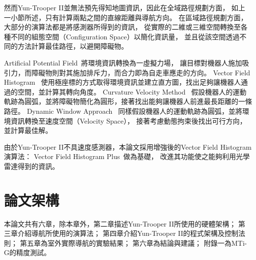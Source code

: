 然而Yun-Trooper II並無法預先得知地圖資訊，因此在全域路徑規劃方面，
如上一小節所述，只有計算兩點之間的直線距離與導航方向。
在區域路徑規劃方面，大部分的演算法都是將感測器所得到的資訊，
從實際的二維或三維空間轉換至各種不同的組態空間（Configuration Space）以簡化資訊量，
並且從該空間透過不同的方法計算最佳路徑，以避開障礙物。

Artificial Potential Field~\cite{Khatib:1985:APF}將環境資訊轉換為一虛擬力場，
讓目標對機器人施加吸引力，而障礙物則對其施加排斥力，而合力即為自走車應走的方向。
Vector Field Histogram~\cite{Borenstein:1991:VFH}
使用極座標的方式取得環境資訊並建立直方圖，找出足夠讓機器人通過的空間，並計算其轉向角度。
Curvature Velocity Method~\cite{Simmons:1996:CVM}
假設機器人的運動軌跡為圓弧，並將障礙物簡化為圓形，接著找出能夠讓機器人前進最長距離的一條路徑。
Dynamic Window Approach~\cite{Thrun:1997:DW}
同樣假設機器人的運動軌跡為圓弧，並將環境資訊轉換至速度空間（Velocity Space），
接著考慮動態拘束後找出可行方向，並計算最佳解。

由於Yun-Trooper II不具速度感測器，本論文採用增強後的Vector Field Histogram演算法：
Vector Field Histogram Plus~\cite{Ulrich:1998:VFHPlus}做為基礎，
改進其功能使之能夠利用光學雷達得到的資訊。

\section{論文架構}
本論文共有六章，除本章外，第二章描述Yun-Trooper II所使用的硬體架構；
第三章介紹導航所使用的演算法；
第四章介紹Yun-Trooper II的程式架構及控制法則；
第五章為室外實際導航的實驗結果；
第六章為結論與建議；
附錄一為MTi-G的精度測試。

